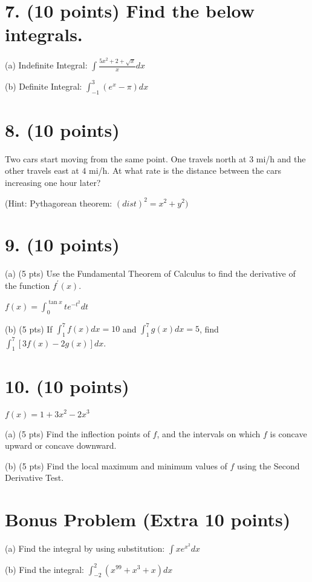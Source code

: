\documentclass[12pt]{article}
\begin{document}
\section*{7. (10 points) Find the below integrals.}

(a) Indefinite Integral: $\int\frac{5x^{2}+2+\sqrt{x}}{x}dx$ 

(b) Definite Integral: $\int_{-1}^{3}(e^{x}-\pi)dx$ 

\newpage

\section{8. (10 points)}

 Two cars start moving from the same point. One travels north at $3$ mi/h and the other travels east at $4$ mi/h. At what rate is the distance between the cars increasing one hour later?

(Hint: Pythagorean theorem: $(dist)^{2}=x^{2}+y^{2})$  

\newpage

\section*{9. (10 points)}

(a) (5 pts) Use the Fundamental Theorem of Calculus to find the derivative of the function $f^{\prime}(x)$. 

$f(x) = \int_{0}^{\tan x} t e^{-t^{2}} dt$

(b) (5 pts) If $\int_{1}^{7} f(x) dx = 10$ and $\int_{1}^{7} g(x) dx = 5$, find $\int_{1}^{7} [3f(x) - 2g(x)] dx$.

\newpage

\section*{10. (10 points)} 

$f(x) = 1 + 3x^{2} - 2x^{3}$ 

(a) (5 pts) Find the inflection points of $f$, and the intervals on which $f$ is concave upward or concave downward.

(b) (5 pts) Find the local maximum and minimum values of $f$ using the Second Derivative Test. 

\newpage

\section*{Bonus Problem (Extra 10 points)}

(a) Find the integral by using substitution: $\int x e^{x^{2}} dx$ 

(b) Find the integral: $\int_{-2}^{2} (x^{99} + x^{3} + x) dx$ 
\end{document}
